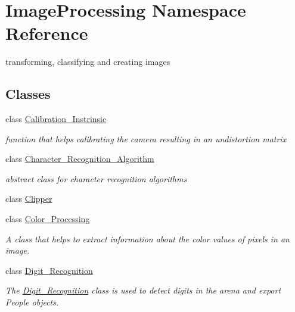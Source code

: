 \hypertarget{namespace_image_processing}{}\section{Image\+Processing Namespace Reference}
\label{namespace_image_processing}


transforming, classifying and creating images  


\subsection*{Classes}
\begin{DoxyCompactItemize}
\item 
class \mbox{\hyperlink{class_image_processing_1_1_calibration___instrinsic}{Calibration\+\_\+\+Instrinsic}}
\begin{DoxyCompactList}\small\item\em function that helps calibrating the camera resulting in an undistortion matrix \end{DoxyCompactList}\item 
class \mbox{\hyperlink{class_image_processing_1_1_character___recognition___algorithm}{Character\+\_\+\+Recognition\+\_\+\+Algorithm}}
\begin{DoxyCompactList}\small\item\em abstract class for character recognition algorithms \end{DoxyCompactList}\item 
class \mbox{\hyperlink{class_image_processing_1_1_clipper}{Clipper}}
\item 
class \mbox{\hyperlink{class_image_processing_1_1_color___processing}{Color\+\_\+\+Processing}}
\begin{DoxyCompactList}\small\item\em A class that helps to extract information about the color values of pixels in an image. \end{DoxyCompactList}\item 
class \mbox{\hyperlink{class_image_processing_1_1_digit___recognition}{Digit\+\_\+\+Recognition}}
\begin{DoxyCompactList}\small\item\em The \mbox{\hyperlink{class_image_processing_1_1_digit___recognition}{Digit\+\_\+\+Recognition}} class is used to detect digits in the arena and export People objects. \end{DoxyCompactList}\item 

\end{DoxyCompactItemize}
